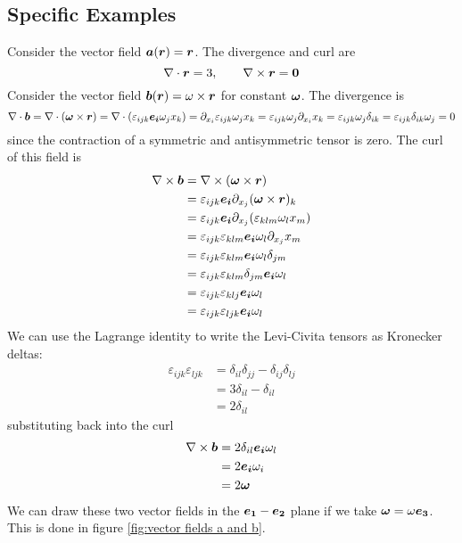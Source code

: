 \documentclass{article}
\newcommand{\pdvx}[1]{\partial_{x_{#1}}}
\begin{document}
    \subsection{Specific Examples}
    Consider the vector field \(\bm{a}(\bm{r}) = \bm{r}\).
    The divergence and curl are
    \[\nabla\cdot\bm{r} = 3,\qquad \nabla\times \bm{r} = \bm{0}\]
    Consider the vector field \(\bm{b}(\bm{r}) = \omega\times\bm{r}\) for constant \(\bm{\omega}\).
    The divergence is
    \[\div\vv b = \div(\vv \omega\times\vv r) = \div(\varepsilon_{ijk}\ve i\omega_jx_k) = \pdvx i\varepsilon_{ijk}\omega_jx_k = \varepsilon_{ijk}\omega_j\pdvx ix_k = \varepsilon_{ijk}\omega_j\delta_{ik} = \varepsilon_{ijk}\delta_{ik} \omega_j = 0\]
    since the contraction of a symmetric and antisymmetric tensor is zero.
    The curl of this field is
    \begin{align*}
        \curl\vv b &= \curl(\vv \omega\times\vv r)\\
        &= \varepsilon_{ijk}\ve i\pdvx j(\vv\omega\times\vv r)_k\\
        &= \varepsilon_{ijk}\ve i\pdvx j(\varepsilon_{klm}\omega_l x_m)\\
        &= \varepsilon_{ijk}\varepsilon_{klm}\ve i\omega_l\pdvx j x_m\\
        &= \varepsilon_{ijk}\varepsilon_{klm}\ve i\omega_l\delta_{jm}\\
        &= \varepsilon_{ijk}\varepsilon_{klm}\delta_{jm}\ve i\omega_l\\
        &= \varepsilon_{ijk}\varepsilon_{klj}\ve i\omega_l\\
        &= \varepsilon_{ijk}\varepsilon_{ljk}\ve i\omega_l
    \end{align*}
    We can use the Lagrange identity to write the Levi-Civita tensors as Kronecker deltas:
    \begin{align*}
        \varepsilon_{ijk}\varepsilon_{ljk} &= \delta_{il}\delta_{jj} - \delta_{ij}\delta_{lj}\\
        &= 3\delta_{il} - \delta_{il}\\
        &= 2\delta_{il}
    \end{align*}
    substituting back into the curl
    \begin{align*}
        \nabla\times\bm{b} &= 2\delta_{il}\bm{e_{i}}\omega_l\\
        &= 2\bm{e_{i}}\omega_i\\
        &= 2\bm{\omega}
    \end{align*}
    We can draw these two vector fields in the \(\bm{e_{1}}-\bm{e_{2}}\) plane if we take \(\bm{\omega} = \omega\bm{e_{3}}\).
    This is done in figure \ref{fig:vector fields a and b}.
    
\end{document}
